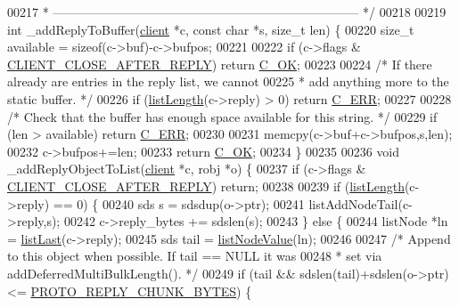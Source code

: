 \begin{DoxyCode}
00217 \textcolor{comment}{ * -------------------------------------------------------------------------- */}
00218 
00219 \textcolor{keywordtype}{int} \_addReplyToBuffer(\hyperlink{structclient}{client} *c, \textcolor{keyword}{const} \textcolor{keywordtype}{char} *s, size\_t len) \{
00220     size\_t available = \textcolor{keyword}{sizeof}(c->buf)-c->bufpos;
00221 
00222     \textcolor{keywordflow}{if} (c->flags & \hyperlink{server_8h_a8cff2154afcc2e87ac85bdbbe2814091}{CLIENT\_CLOSE\_AFTER\_REPLY}) \textcolor{keywordflow}{return} 
      \hyperlink{server_8h_a303769ef1065076e68731584e758d3e1}{C\_OK};
00223 
00224     \textcolor{comment}{/* If there already are entries in the reply list, we cannot}
00225 \textcolor{comment}{     * add anything more to the static buffer. */}
00226     \textcolor{keywordflow}{if} (\hyperlink{adlist_8h_afde0ab079f934670e82119b43120e94b}{listLength}(c->reply) > 0) \textcolor{keywordflow}{return} \hyperlink{server_8h_af98ac28d5f4d23d7ed5985188e6fb7d1}{C\_ERR};
00227 
00228     \textcolor{comment}{/* Check that the buffer has enough space available for this string. */}
00229     \textcolor{keywordflow}{if} (len > available) \textcolor{keywordflow}{return} \hyperlink{server_8h_af98ac28d5f4d23d7ed5985188e6fb7d1}{C\_ERR};
00230 
00231     memcpy(c->buf+c->bufpos,s,len);
00232     c->bufpos+=len;
00233     \textcolor{keywordflow}{return} \hyperlink{server_8h_a303769ef1065076e68731584e758d3e1}{C\_OK};
00234 \}
00235 
00236 \textcolor{keywordtype}{void} \_addReplyObjectToList(\hyperlink{structclient}{client} *c, robj *o) \{
00237     \textcolor{keywordflow}{if} (c->flags & \hyperlink{server_8h_a8cff2154afcc2e87ac85bdbbe2814091}{CLIENT\_CLOSE\_AFTER\_REPLY}) \textcolor{keywordflow}{return};
00238 
00239     \textcolor{keywordflow}{if} (\hyperlink{adlist_8h_afde0ab079f934670e82119b43120e94b}{listLength}(c->reply) == 0) \{
00240         sds s = sdsdup(o->ptr);
00241         listAddNodeTail(c->reply,s);
00242         c->reply\_bytes += sdslen(s);
00243     \} \textcolor{keywordflow}{else} \{
00244         listNode *ln = \hyperlink{adlist_8h_a5e0fad60032ef0fe9adcf9811e2f2fba}{listLast}(c->reply);
00245         sds tail = \hyperlink{adlist_8h_af84cae230e7180ebcda1e2736fce9f65}{listNodeValue}(ln);
00246 
00247         \textcolor{comment}{/* Append to this object when possible. If tail == NULL it was}
00248 \textcolor{comment}{         * set via addDeferredMultiBulkLength(). */}
00249         \textcolor{keywordflow}{if} (tail && sdslen(tail)+sdslen(o->ptr) <= \hyperlink{server_8h_ab467e0a40be9097e85445616d9bb32e3}{PROTO\_REPLY\_CHUNK\_BYTES}) \{

\end{DoxyCode}
